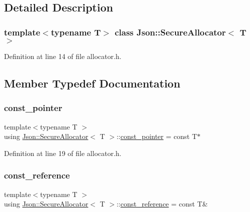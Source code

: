 \subsection{Detailed Description}
\subsubsection*{template$<$typename T$>$\newline
class Json\+::\+Secure\+Allocator$<$ T $>$}



Definition at line 14 of file allocator.\+h.



\subsection{Member Typedef Documentation}
\hypertarget{class_json_1_1_secure_allocator_a464b356817c78ea996cd3a7403f7e735}{}\label{class_json_1_1_secure_allocator_a464b356817c78ea996cd3a7403f7e735} 
\subsubsection{\texorpdfstring{const\+\_\+pointer}{const\_pointer}}
{\footnotesize\ttfamily template$<$typename T $>$ \\
using \hyperlink{class_json_1_1_secure_allocator}{Json\+::\+Secure\+Allocator}$<$ T $>$\+::\hyperlink{class_json_1_1_secure_allocator_a464b356817c78ea996cd3a7403f7e735}{const\+\_\+pointer} =  const T$\ast$}



Definition at line 19 of file allocator.\+h.

\hypertarget{class_json_1_1_secure_allocator_a3f0327d609dcd1942c8c7fa4d4f227e5}{}\label{class_json_1_1_secure_allocator_a3f0327d609dcd1942c8c7fa4d4f227e5} 
\subsubsection{\texorpdfstring{const\+\_\+reference}{const\_reference}}
{\footnotesize\ttfamily template$<$typename T $>$ \\
using \hyperlink{class_json_1_1_secure_allocator}{Json\+::\+Secure\+Allocator}$<$ T $>$\+::\hyperlink{class_json_1_1_secure_allocator_a3f0327d609dcd1942c8c7fa4d4f227e5}{const\+\_\+reference} =  const T\&}



